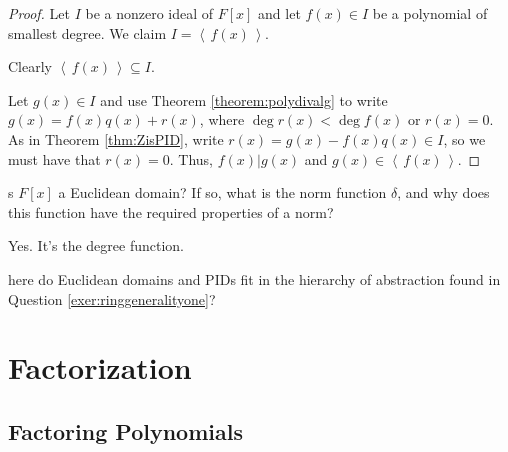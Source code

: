 \documentclass[english,course]{lecture}
\newcommand{\ideal}[1]{\left\langle\, #1 \,\right\rangle}
\newenvironment{hint}{\startimportant}{}
\def\startimportant#1\end{[{Hint:} #1]\end}
\theoremstyle{plain}
\newenvironment{question}[1]
  {\renewcommand\theinnerquestion{#1}\innerquestion}
  {\endinnerquestion}
\def\presnotes{}
\begin{document}
\presnotes




\begin{proof}
	Let $I$ be a nonzero ideal of $F[x]$ and let $f(x)\in I$ be a polynomial of smallest degree.
	We claim $I = \ideal{f(x)}$.
	
	Clearly $\ideal{f(x)}\subseteq I$.
	
	Let $g(x)\in I$ and use Theorem \ref{theorem:polydivalg} to write $g(x) = f(x) q(x) + r(x)$, where $\deg r(x) < \deg f(x)$ or $r(x) = 0$.
	As in Theorem \ref{thm:ZisPID}, write $r(x) = g(x) - f(x) q(x) \in I$, so we must have that $r(x) = 0$.
	Thus, $f(x) | g(x)$ and $g(x)\in \ideal{f(x)}$.
\end{proof}

\presnotes

\begin{question}
	Is $F[x]$ a Euclidean domain? If so, what is the norm function $\delta$, and why does this function have the required properties of a norm?
\end{question}

\begin{answer}
	Yes. It's the degree function.
\end{answer}

\presnotes






\begin{question}
	Where do Euclidean domains and PIDs fit in the hierarchy of abstraction found in Question \ref{exer:ringgeneralityone}?
\end{question}

\presnotes


\newpage


\section{Factorization}\label{Sec-Factorization}


\subsection{Factoring Polynomials}\label{SubSec-Factoring-Polynomials}
\end{document}

